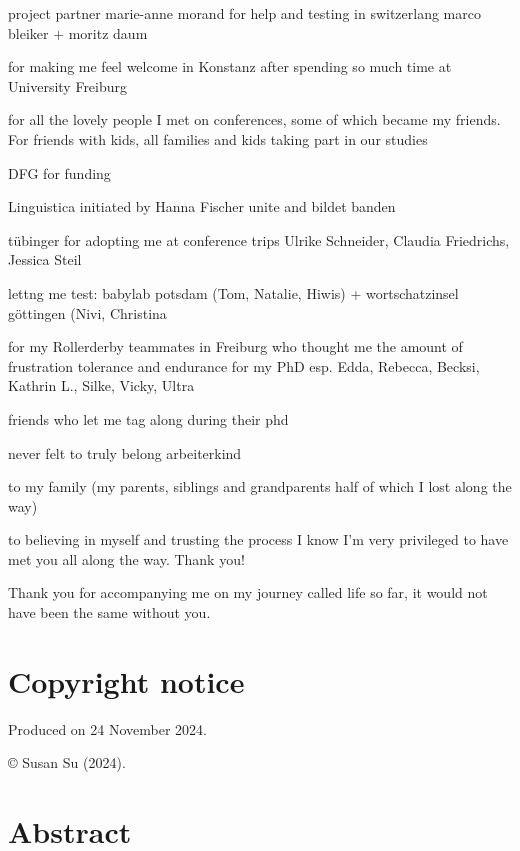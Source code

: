 \documentclass[
  11pt,
  a4paper,
  nottoc]{report}
\renewcommand*\contentsname{Table of contents}
\newcommand\contentsname{Table of contents}
\begin{document}
project partner marie-anne morand
for help and testing in switzerlang marco bleiker + moritz daum

for making me feel welcome in Konstanz after spending so much time at University Freiburg

for all the lovely people I met on conferences, some of which became my friends.
For friends with kids, all families and kids taking part in our studies

DFG for funding

Linguistica initiated by Hanna Fischer
unite and bildet banden

tübinger for adopting me at conference trips Ulrike Schneider, Claudia Friedrichs, Jessica Steil

lettng me test: babylab potsdam (Tom, Natalie, Hiwis) + wortschatzinsel göttingen (Nivi, Christina


for my Rollerderby teammates in Freiburg who thought me the amount of frustration tolerance and endurance for my PhD
esp. Edda, Rebecca, Becksi, Kathrin L., Silke, Vicky, Ultra

friends who let me tag along during their phd

never felt to truly belong
arbeiterkind

to my family (my parents, siblings and grandparents half of which I lost along the way)

to believing in myself and trusting the process
I know I'm very privileged to have met you all along the way.
Thank you!


Thank you for accompanying me on my journey called life so far, it would not have been the same without you.

\renewcommand*\contentsname{Contents}
{
\setcounter{tocdepth}{1}
\tableofcontents
}
\listoffigures
\listoftables
{}

\chapter*{Copyright notice}\label{copyright-notice}


Produced on 24 November 2024.

© Susan Su (2024).


\chapter*{Abstract}\label{abstract}
\end{document}
